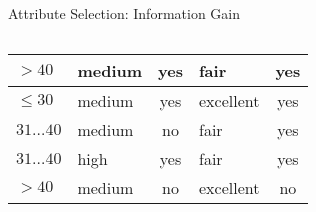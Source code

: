 \begin{frame}{Attribute Selection: Information Gain}
\begin{columns}
\begin{column}{0.45\textwidth}
{\begin{tabular}{|l|l|c|l|c|}
					\cellcolor{yellow!20}$>40$        & \cellcolor{yellow!20}medium & \cellcolor{yellow!20}yes   & \cellcolor{yellow!20}fair         & \cellcolor{green!20}yes            \\\hline
					\cellcolor{yellow!20}$\leq30$     & \cellcolor{yellow!20}medium & \cellcolor{yellow!20}yes   & \cellcolor{yellow!20}excellent    & \cellcolor{green!20}yes            \\\hline
					\cellcolor{yellow!20}$31\ldots40$ & \cellcolor{yellow!20}medium & \cellcolor{yellow!20}no    & \cellcolor{yellow!20}fair         & \cellcolor{green!20}yes            \\\hline
					\cellcolor{yellow!20}$31\ldots40$ & \cellcolor{yellow!20}high   & \cellcolor{yellow!20}yes   & \cellcolor{yellow!20}fair         & \cellcolor{green!20}yes            \\\hline
					\cellcolor{yellow!20}$>40$        & \cellcolor{yellow!20}medium & \cellcolor{yellow!20}no    & \cellcolor{yellow!20}excellent    & \cellcolor{red!20}no               \\\hline
				\end{tabular}}
		\end{column}
	\end{columns}
\end{frame}

